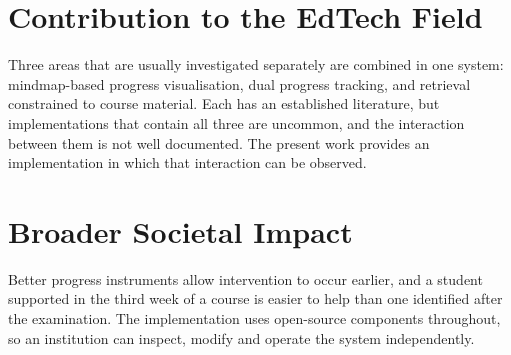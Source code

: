 \section{Contribution to the EdTech Field}

Three areas that are usually investigated separately are combined in one system: mindmap-based progress visualisation, dual progress tracking, and retrieval constrained to course material. Each has an established literature, but implementations that contain all three are uncommon, and the interaction between them is not well documented. The present work provides an implementation in which that interaction can be observed.

\section{Broader Societal Impact}

Better progress instruments allow intervention to occur earlier, and a student supported in the third week of a course is easier to help than one identified after the examination. The implementation uses open-source components throughout, so an institution can inspect, modify and operate the system independently.
